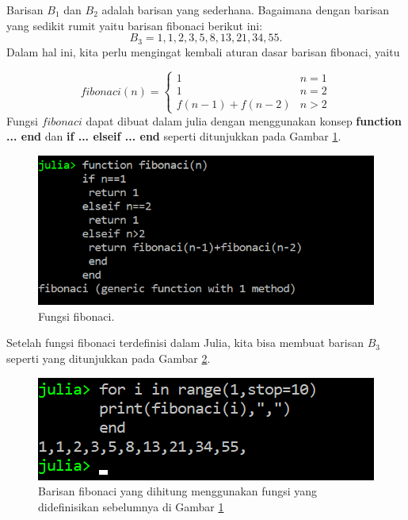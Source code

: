 \documentclass[12pt,a4paper]{memoir}
\begin{document}
Barisan $B_1$ dan $B_2$ adalah barisan yang sederhana. Bagaimana dengan barisan yang sedikit rumit yaitu barisan fibonaci berikut ini:
\begin{equation*}
B_3 =1,1,2,3,5,8,13,21,34,55.
\end{equation*}
Dalam hal ini, kita perlu mengingat kembali aturan dasar barisan fibonaci, yaitu

\begin{equation*}
fibonaci(n) =\begin{cases} 
1 & n=1 \\
1 & n=2 \\
f(n-1)+f(n-2) & n>2 
\end{cases}
\end{equation*}
Fungsi $fibonaci$ dapat dibuat dalam julia dengan menggunakan konsep \textbf{function ... end} dan \textbf{if ... elseif ... end} seperti ditunjukkan pada Gambar \ref{fig:barisanfibonaci}.

\begin{figure}[h]
	\centering
	\includegraphics{images/barisanfibonaci}
	\caption{Fungsi fibonaci.}
	\label{fig:barisanfibonaci}
\end{figure}

Setelah fungsi fibonaci terdefinisi dalam Julia, kita bisa membuat barisan $B_3$ seperti yang ditunjukkan pada Gambar \ref{fig:barisanfibonaci2}.
\begin{figure}[h]
	\centering
	\includegraphics{images/barisanfibonaci2}
	\caption{Barisan fibonaci yang dihitung menggunakan fungsi yang didefinisikan sebelumnya di Gambar \ref{fig:barisanfibonaci}}
	\label{fig:barisanfibonaci2}
\end{figure}
\end{document}
